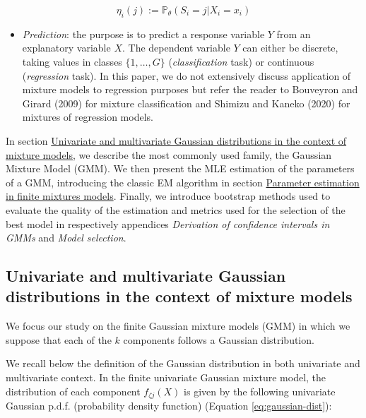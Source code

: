\begin{equation}
        \eta_{i} (j) := \mathbb{P}_{\theta} (S_i=j |X_i=x_i)
    \label{eq:posteriori}
\end{equation}

\begin{itemize}
\tightlist
\item
  \emph{Prediction}: the purpose is to predict a response variable \(Y\) from
  an explanatory variable \(X\). The dependent variable \(Y\) can either
  be discrete, taking values in classes \(\{1, \ldots, G\}\)
  (\emph{classification} task) or continuous (\emph{regression} task). In this
  paper, we do not extensively discuss application of mixture models to regression purposes but refer the reader
  to Bouveyron and Girard (2009) for mixture classification and
  Shimizu and Kaneko (2020) for mixtures of regression models.
\end{itemize}

In section \protect\hyperlink{univariate-and-multivariate-gaussian-distributions-in-the-context-of-mixture-models}{Univariate and multivariate Gaussian distributions in the context of mixture models}, we describe the most
commonly used family, the Gaussian Mixture Model (GMM). We then present
the MLE estimation of the parameters of a GMM, introducing the classic
EM algorithm in section \protect\hyperlink{parameter-estimation-in-finite-mixtures-models}{Parameter estimation in finite mixtures models}. Finally, we introduce bootstrap methods used to evaluate the
quality of the estimation and metrics used for the selection of the best
model in respectively appendices \emph{Derivation of confidence intervals in GMMs} and \emph{Model selection}.

\hypertarget{univariate-and-multivariate-gaussian-distributions-in-the-context-of-mixture-models}{%
\subsection{Univariate and multivariate Gaussian distributions in the context of mixture models}\label{univariate-and-multivariate-gaussian-distributions-in-the-context-of-mixture-models}}

We focus our study on the finite Gaussian mixture models (GMM) in which we
suppose that each of the \(k\) components follows a Gaussian
distribution.

We recall below the definition of the Gaussian
distribution in both univariate and multivariate context. In the finite univariate Gaussian mixture model, the distribution of
each component \(f_{\zeta j}(X)\) is given by the following univariate
Gaussian p.d.f. (probability density function) (Equation
\eqref{eq:gaussian-dist}):

